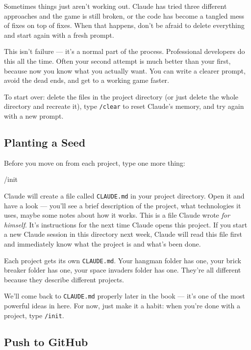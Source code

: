 \documentclass[11pt,a4paper]{article}
\begin{document}
Sometimes things just aren't working out. Claude has tried three different approaches and the game is still broken, or the code has become a tangled mess of fixes on top of fixes. When that happens, don't be afraid to delete everything and start again with a fresh prompt.

This isn't failure --- it's a normal part of the process. Professional developers do this all the time. Often your second attempt is much better than your first, because now you know what you actually want. You can write a clearer prompt, avoid the dead ends, and get to a working game faster.

To start over: delete the files in the project directory (or just delete the whole directory and recreate it), type \texttt{/clear} to reset Claude's memory, and try again with a new prompt.

\subsection{Planting a Seed}

Before you move on from each project, type one more thing:

\begin{tcolorbox}[termbox]
/init
\end{tcolorbox}

Claude will create a file called \texttt{CLAUDE.md} in your project directory. Open it and have a look --- you'll see a brief description of the project, what technologies it uses, maybe some notes about how it works. This is a file Claude wrote \emph{for himself}. It's instructions for the next time Claude opens this project. If you start a new Claude session in this directory next week, Claude will read this file first and immediately know what the project is and what's been done.

Each project gets its own \texttt{CLAUDE.md}. Your hangman folder has one, your brick breaker folder has one, your space invaders folder has one. They're all different because they describe different projects.

We'll come back to \texttt{CLAUDE.md} properly later in the book --- it's one of the most powerful ideas in here. For now, just make it a habit: when you're done with a project, type \texttt{/init}.

\subsection{Push to GitHub}
\end{document}
